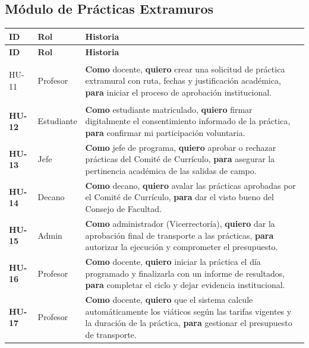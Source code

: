 \documentclass[12pt,a4paper]{article}
\begin{document}
\subsection{Módulo de Prácticas Extramuros}

\begin{longtable}{>{\bfseries}p{1.2cm} p{3cm} p{9cm}}
  \toprule
  \textbf{ID} & \textbf{Rol} & \textbf{Historia} \\
  \midrule
  \endfirsthead
  \toprule \textbf{ID} & \textbf{Rol} & \textbf{Historia} \\ \midrule
  \endhead

  HU-11 & Profesor & \textbf{Como} docente, \textbf{quiero} crear una solicitud de práctica extramural con ruta, fechas y justificación académica, \textbf{para} iniciar el proceso de aprobación institucional. \\[4pt]

  HU-12 & Estudiante & \textbf{Como} estudiante matriculado, \textbf{quiero} firmar digitalmente el consentimiento informado de la práctica, \textbf{para} confirmar mi participación voluntaria. \\[4pt]

  HU-13 & Jefe & \textbf{Como} jefe de programa, \textbf{quiero} aprobar o rechazar prácticas del Comité de Currículo, \textbf{para} asegurar la pertinencia académica de las salidas de campo. \\[4pt]

  HU-14 & Decano & \textbf{Como} decano, \textbf{quiero} avalar las prácticas aprobadas por el Comité de Currículo, \textbf{para} dar el visto bueno del Consejo de Facultad. \\[4pt]

  HU-15 & Admin & \textbf{Como} administrador (Vicerrectoría), \textbf{quiero} dar la aprobación final de transporte a las prácticas, \textbf{para} autorizar la ejecución y comprometer el presupuesto. \\[4pt]

  HU-16 & Profesor & \textbf{Como} docente, \textbf{quiero} iniciar la práctica el día programado y finalizarla con un informe de resultados, \textbf{para} completar el ciclo y dejar evidencia institucional. \\[4pt]

  HU-17 & Profesor & \textbf{Como} docente, \textbf{quiero} que el sistema calcule automáticamente los viáticos según las tarifas vigentes y la duración de la práctica, \textbf{para} gestionar el presupuesto de transporte. \\[4pt]


\end{longtable}
\end{document}
